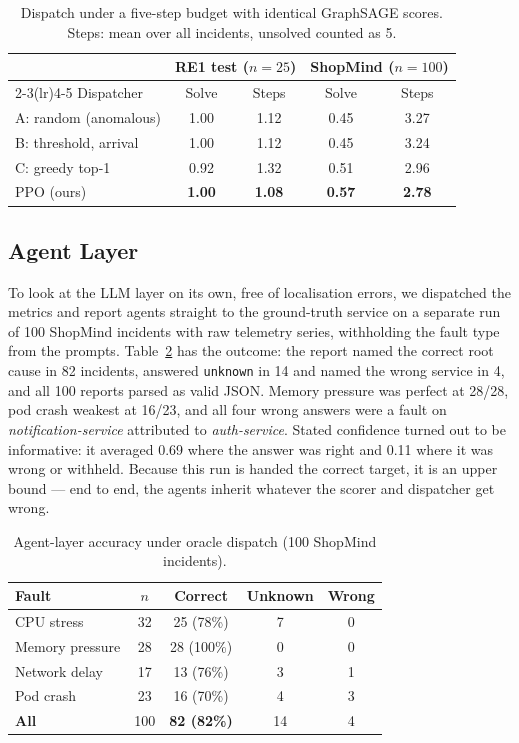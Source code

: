 \documentclass[conference,a4paper]{IEEEtran}
\begin{document}
\begin{table}[t]
\centering
\caption{Dispatch under a five-step budget with identical GraphSAGE scores. Steps: mean over all incidents, unsolved counted as 5.}
\label{tab:dispatch}
\setlength{\tabcolsep}{4pt}
\begin{tabular}{lcccc}
\toprule
 & \multicolumn{2}{c}{\textbf{RE1 test ($n=25$)}} & \multicolumn{2}{c}{\textbf{ShopMind ($n=100$)}} \\
\cmidrule(lr){2-3}\cmidrule(lr){4-5}
Dispatcher & Solve & Steps & Solve & Steps \\
\midrule
A: random (anomalous)   & 1.00 & 1.12 & 0.45 & 3.27 \\
B: threshold, arrival   & 1.00 & 1.12 & 0.45 & 3.24 \\
C: greedy top-1         & 0.92 & 1.32 & 0.51 & 2.96 \\
PPO (ours)              & \textbf{1.00} & \textbf{1.08} & \textbf{0.57} & \textbf{2.78} \\
\bottomrule
\end{tabular}
\end{table}

\subsection{Agent Layer}
To look at the LLM layer on its own, free of localisation errors, we dispatched the metrics and report agents straight to the ground-truth service on a separate run of 100 ShopMind incidents with raw telemetry series, withholding the fault type from the prompts. Table~\ref{tab:agents} has the outcome: the report named the correct root cause in 82 incidents, answered \texttt{unknown} in 14 and named the wrong service in 4, and all 100 reports parsed as valid JSON. Memory pressure was perfect at 28/28, pod crash weakest at 16/23, and all four wrong answers were a fault on \emph{notification-service} attributed to \emph{auth-service}. Stated confidence turned out to be informative: it averaged 0.69 where the answer was right and 0.11 where it was wrong or withheld. Because this run is handed the correct target, it is an upper bound --- end to end, the agents inherit whatever the scorer and dispatcher get wrong.

\begin{table}[t]
\centering
\caption{Agent-layer accuracy under oracle dispatch (100 ShopMind incidents).}
\label{tab:agents}
\begin{tabular}{lcccc}
\toprule
Fault & $n$ & Correct & Unknown & Wrong \\
\midrule
CPU stress       & 32 & 25 (78\%)  & 7 & 0 \\
Memory pressure  & 28 & 28 (100\%) & 0 & 0 \\
Network delay    & 17 & 13 (76\%)  & 3 & 1 \\
Pod crash        & 23 & 16 (70\%)  & 4 & 3 \\
\midrule
\textbf{All}     & 100 & \textbf{82 (82\%)} & 14 & 4 \\
\bottomrule
\end{tabular}
\end{table}
\end{document}

